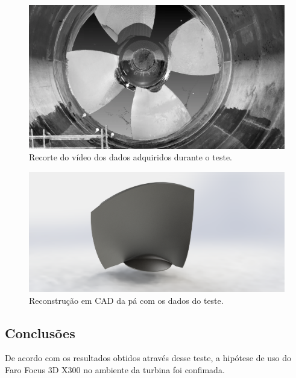 \begin{figure}[h!]
\centering
	\includegraphics[width=0.4\columnwidth]{figs/faro/recorte_video}
	\caption{Recorte do vídeo dos dados adquiridos durante o teste.}
	\label{fig::video}
\end{figure}

\begin{figure}[h!]
\centering
	\includegraphics[width=0.5\columnwidth]{figs/faro/Pa_Real_Render_04}
	\caption{Reconstrução em CAD da pá com os dados do teste.}
	\label{fig::pa}
\end{figure}



\subsection{Conclusões}

De acordo com os resultados obtidos através desse teste, a hipótese de uso do
Faro Focus 3D X300 no ambiente da turbina foi confimada.
